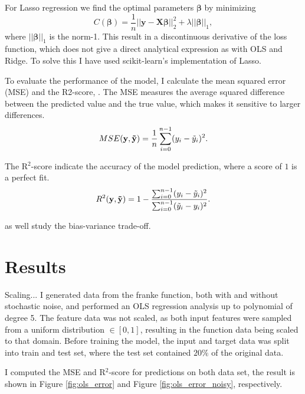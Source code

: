 For Lasso regression we find the optimal parameters $\mathbf{\beta}$ by minimizing
\begin{equation}\label{eq:lasso_cost}
    C (\mathbf{\beta}) = \frac{1}{n} || \mathbf{y} - \mathbf{X} \mathbf{\beta} ||_{2}^{2} + \lambda || \mathbf{\beta} ||_{1} ,
\end{equation}
where $|| \mathbf{\beta} ||_{1}$ is the norm-1. This result in a discontinuous derivative of the loss function, which does not give a direct analytical expression as with OLS and Ridge. To solve this I have used scikit-learn's implementation of Lasso.


To evaluate the performance of the model, I calculate the mean squared error (MSE) and the R2-score, . The MSE measures the average squared difference between the predicted value and the true value, which makes it sensitive to larger differences. 
\begin{equation}\label{eq:mse}
    MSE(\mathbf{y}, \mathbf{\Tilde{y}}) = \frac{1}{n} \sum_{i=0}^{n-1} (y_{i} - \Tilde{y}_{i})^{2}.
\end{equation}

The R$^{2}$-score indicate the accuracy of the model prediction, where a score of $1$ is a perfect fit.
\begin{equation}\label{eq:r2}
    R^{2}(\mathbf{y}, \mathbf{\Tilde{y}}) = 1 - \frac{\sum_{i=0}^{n-1} (y_{i} - \Tilde{y}_{i})^{2}}{\sum_{i=0}^{n-1} (\Tilde{y}_{i} - y_{i})^{2}}.
\end{equation}

as well study the bias-variance trade-off. 


\section{Results}\label{sec:results}
Scaling... 
I generated data from the franke function, both with and without stochastic noise, and performed an OLS regression analysis up to polynomial of degree 5. The feature data was not scaled, as both input features were sampled from a uniform distribution $\in [0, 1]$, resulting in the function data being scaled to that domain. Before training the model, the input and target data was split into train and test set, where the test set contained $20\%$ of the original data.

I computed the MSE and R$^{2}$-score for predictions on both data set, the result is shown in Figure \ref{fig:ols_error} and Figure \ref{fig:ols_error_noisy}, respectively.

